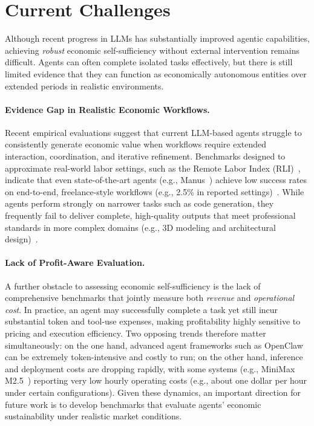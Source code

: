 \section{Current Challenges}
\label{sec:challenge}



Although recent progress in LLMs has substantially improved agentic capabilities, achieving \emph{robust} economic self-sufficiency without external intervention remains difficult. Agents can often complete isolated tasks effectively, but there is still limited evidence that they can function as economically autonomous entities over extended periods in realistic environments.

\paragraph{Evidence Gap in Realistic Economic Workflows.}
Recent empirical evaluations suggest that current LLM-based agents struggle to consistently generate economic value when workflows require extended interaction, coordination, and iterative refinement. Benchmarks designed to approximate real-world labor settings, such as the Remote Labor Index (RLI)~\cite{mazeika2025remote}, indicate that even state-of-the-art agents (e.g., Manus~\cite{manus}) achieve low success rates on end-to-end, freelance-style workflows (e.g., 2.5\% in reported settings)~\cite{mazeika2025remote}. While agents perform strongly on narrower tasks such as code generation, they frequently fail to deliver complete, high-quality outputs that meet professional standards in more complex domains (e.g., 3D modeling and architectural design)~\cite{mazeika2025remote}.

\paragraph{Lack of Profit-Aware Evaluation.} 
A further obstacle to assessing economic self-sufficiency is the lack of comprehensive benchmarks that jointly measure both \emph{revenue} and \emph{operational cost}. In practice, an agent may successfully complete a task yet still incur substantial token and tool-use expenses, making profitability highly sensitive to pricing and execution efficiency. Two opposing trends therefore matter simultaneously: on the one hand, advanced agent frameworks such as OpenClaw can be extremely token-intensive and costly to run; on the other hand, inference and deployment costs are dropping rapidly, with some systems (e.g., MiniMax M2.5~\cite{minimax}) reporting very low hourly operating costs (e.g., about one dollar per hour under certain configurations). Given these dynamics, an important direction for future work is to develop benchmarks that evaluate agents' economic sustainability under realistic market conditions. 

